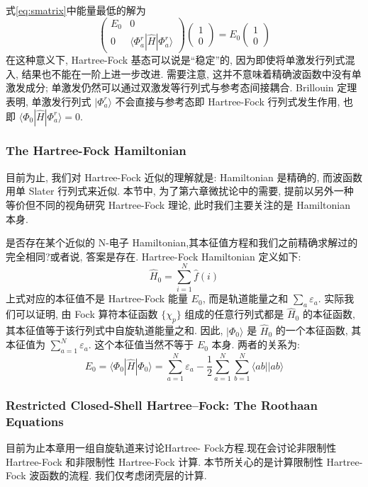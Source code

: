 \documentclass[fontset=none,12pt,a4paper]{ctexart}
\numberwithin{equation}{section}
\begin{document}
式\ref{eq:smatrix}中能量最低的解为
\begin{equation}
  \begin{pmatrix}
  E_0 & 0 \\
    0 & \langle\Phi_a^r|\hat{H}|\Phi_a^r\rangle
  \end{pmatrix}
  \begin{pmatrix}
    1 \\
    0
  \end{pmatrix}
  =E_0
  \begin{pmatrix}
    1 \\
    0
  \end{pmatrix}
\end{equation}
在这种意义下, Hartree-Fock 基态可以说是“稳定”的, 因为即使将单激发行列式混入, 结果也不能在一阶上进一步改进.
需要注意, 这并不意味着精确波函数中没有单激发成分; 单激发仍然可以通过双激发等行列式与参考态间接耦合.
Brillouin 定理表明, 单激发行列式 $|\Phi_a^r\rangle$ 不会直接与参考态即 Hartree-Fock 行列式发生作用, 
也即 $\langle\Phi_0|\hat{H}|\Phi_a^r\rangle = 0$.
\subsubsection{The Hartree-Fock Hamiltonian}
目前为止, 我们对 Hartree-Fock 近似的理解就是: Hamiltonian 是精确的,
而波函数用单 Slater 行列式来近似. 本节中, 为了第六章微扰论中的需要,
提前以另外一种等价但不同的视角研究 Hartree-Fock 理论, 此时我们主要关注的是 Hamiltonian 本身.

是否存在某个近似的 N-电子 Hamiltonian,其本征值方程和我们之前精确求解过的完全相同?或者说,
答案是存在. Hartree-Fock Hamiltonian 定义如下:
  \begin{equation}
    \hat{H}_0 =\sum_{i=1}^N\hat{f}(i)
  \end{equation}
上式对应的本征值不是 Hartree-Fock 能量 $E_0$, 而是轨道能量之和 $\sum_a\varepsilon_a$.
实际我们可以证明, 由 Fock 算符本征函数 $\{\chi_p\}$ 组成的任意行列式都是 $\hat{H}_0$ 的本征函数,
其本征值等于该行列式中自旋轨道能量之和. 因此, $|\Phi_0\rangle$ 是 $\hat{H}_0$ 的一个本征函数,
其本征值为 $\sum_{a=1}^N\varepsilon_a$.
这个本征值当然不等于 $E_0$ 本身. 两者的关系为:
\begin{equation}
  E_0 = \langle\Phi_0|\hat{H}|\Phi_0\rangle
  = \sum_{a=1}^N\varepsilon_a
  - \frac12\sum_{a=1}^N\sum_{b=1}^N\langle ab||ab\rangle
\end{equation}
\subsubsection{Restricted Closed-Shell Hartree--Fock: The Roothaan Equations}
目前为止本章用一组自旋轨道来讨论Hartree- Fock方程.现在会讨论非限制性 Hartree-Fock 和非限制性 
Hartree-Fock 计算. 本节所关心的是计算限制性 Hartree-Fock 波函数的流程. 我们仅考虑闭壳层的计算.
\end{document}
